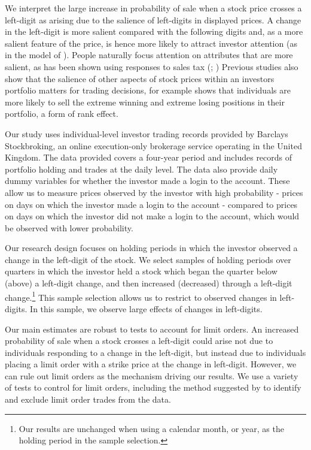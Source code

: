 We interpret the large increase in probability of sale when a stock price crosses a left-digit as arising due to the salience of left-digits in displayed prices. A change in the left-digit is more salient compared with the following digits and, as a more salient feature of the price, is hence more likely to attract investor attention (as in the model of \cite{bordalo2012salience}). People naturally focus attention on attributes that are more salient, as has been shown using responses to sales tax (\citealp{chetty2009salience}; \citealp{finkelstein2009ztax}) Previous studies also show that the salience of other aspects of stock prices within an investors portfolio matters for trading decisions, for example \cite{hartzmark2015} shows that individuals are more likely to sell the extreme winning and extreme losing positions in their portfolio, a form of rank effect. 

Our study uses individual-level investor trading records provided by Barclays Stockbroking, an online execution-only brokerage service operating in the United Kingdom. The data provided covers a four-year period and includes records of portfolio holding and trades at the daily level. The data also provide daily dummy variables for whether the investor made a login to the account. These allow us to measure prices observed by the investor with high probability - prices on days on which the investor made a login to the account - compared to prices on days on which the investor did not make a login to the account, which would be observed with lower probability.

Our research design focuses on holding periods in which the investor observed a change in the left-digit of the stock. We select samples of holding periods over quarters in which the investor held a stock which began the quarter below (above) a left-digit change, and then increased (decreased) through a left-digit change.\footnote{Our results are unchanged when using a calendar month, or year, as the holding period in the sample selection.} This sample selection allows us to restrict to observed changes in left-digits. In this sample, we observe large effects of changes in left-digits.

Our main estimates are robust to tests to account for limit orders. An increased probability of sale when a stock crosses a left-digit could arise not due to individuals responding to a change in the left-digit, but instead due to individuals placing a limit order with a strike price at the change in left-digit. However, we can rule out limit orders as the mechanism driving our results. We use a variety of tests to control for limit orders, including the method suggested by \cite{linnainmaa2010limit} to identify and exclude limit order trades from the data. 

